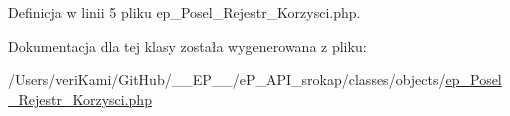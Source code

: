 Definicja w linii 5 pliku ep\-\_\-\-Posel\-\_\-\-Rejestr\-\_\-\-Korzysci.\-php.



Dokumentacja dla tej klasy została wygenerowana z pliku\-:\begin{DoxyCompactItemize}
\item 
/\-Users/veri\-Kami/\-Git\-Hub/\-\_\-\-\_\-\-E\-P\-\_\-\-\_\-/e\-P\-\_\-\-A\-P\-I\-\_\-srokap/classes/objects/\hyperlink{ep___posel___rejestr___korzysci_8php}{ep\-\_\-\-Posel\-\_\-\-Rejestr\-\_\-\-Korzysci.\-php}\end{DoxyCompactItemize}
